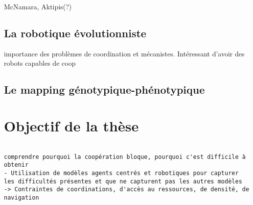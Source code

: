 McNamara, Aktipis(?)

\subsection{La robotique évolutionniste}

importance des problèmes de coordination et mécanistes.
Intéressant d'avoir des robots capables de coop

\subsection{Le mapping génotypique-phénotypique}


\section{Objectif de la thèse}

\begin{verbatim}
    
comprendre pourquoi la coopération bloque, pourquoi c'est difficile à obtenir
- Utilisation de modèles agents centrés et robotiques pour capturer les difficultés présentes et que ne capturent pas les autres modèles
-> Contraintes de coordinations, d'accès au ressources, de densité, de navigation
\end{verbatim}

